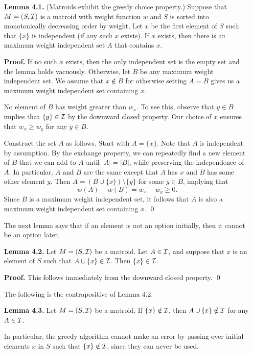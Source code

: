 \documentclass{article}
\begin{document}
{\color{violet}
{\bf Lemma 4.1.} (Matroids exhibit the greedy choice property.) Suppose 
that $M = (S, {\cal I})$ is a matroid with weight function $w$ and $S$ 
is sorted into monotonically decreasing order by weight. Let $x$ 
be the first element of $S$ such that $\{x\}$ is independent (if any 
such $x$ exists). If $x$ exists, then there is an maximum weight 
independent set $A$ that contains $x$. 
}

{\color{blue}
{\bf Proof.} If no such $x$ exists, then the only independent set is the 
empty set and the lemma holds vacuously. Otherwise, let $B$ be any 
maximum weight independent set. We assume that $x \notin B$ for otherwise 
setting $A = B$ gives us a maximum weight independent set containing $x$. 

No element of $B$ has weight greater than $w_x$. To see this, observe that 
$y \in B$ implies that $\{y\} \in {\cal I}$ by the downward closed property. 
Our choice of $x$ ensures that $w_x \geq w_y$ for any $y \in B$. 

Construct the set $A$ as follows. Start with $A = \{x\}$. Note that $A$ 
is independent by assumption. By the exchange property, we can repeatedly 
find a new element of $B$ that we can add to $A$ until $|A| = |B|$, 
while preserving the independence of $A$. In particular, $A$ and $B$ 
are the same except that $A$ has $x$ and $B$ has some other element $y$. 
Then $A = (B \cup \{x\}) \setminus \{y\}$ for some $y \in B$, implying that 
\[ w(A) - w(B) = w_x - w_y \geq 0. \] 
Since $B$ is a maximum weight independent set, it follows that $A$ 
is also a maximum weight independent set containing $x$. \qed 
}

The next lemma says that if an element is not an option initially, then 
it cannot be an option later. 

{\color{violet}
{\bf Lemma 4.2.} Let $M = (S, {\cal I})$ be a matroid. Let $A \in {\cal I}$, 
and suppose that $x$ is an element of $S$ such that $A \cup \{x\} \in {\cal I}$. 
Then $\{x\} \in {\cal I}$. 
}

{\color{blue}
{\bf Proof.} This follows immediately from the downward closed property. \qed 
}

The following is the contrapositive of Lemma 4.2. 

{\color{violet}
{\bf Lemma 4.3.} Let $M = (S, {\cal I})$ be a matroid. If 
$\{x\} \notin {\cal I}$, then $A \cup \{x\} \notin {\cal I}$ for any 
$A \in {\cal I}$.
}

In particular, the greedy algorithm cannot make an error by passing 
over initial elements $x$ in $S$ such that $\{x\} \notin {\cal I}$, 
since they can never be used. 
\end{document}
